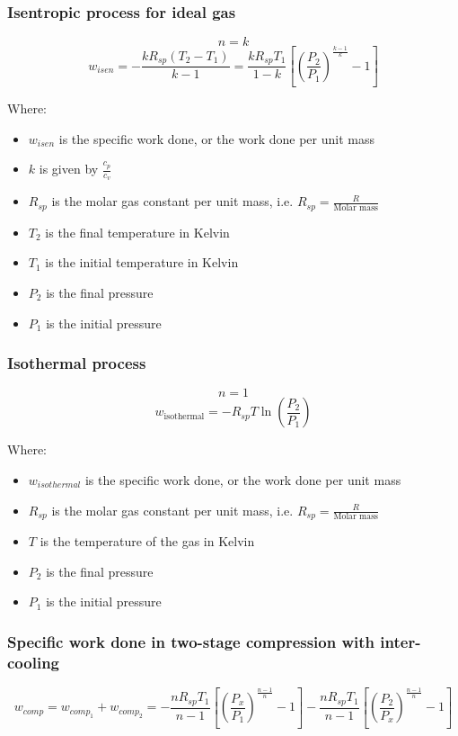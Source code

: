 \documentclass[11pt]{article}
\begin{document}
\subsubsection{Isentropic process for ideal gas}
\label{sec:org0c5a5aa}
\[n = k\]
\[w_{isen} = - \frac{k R_{sp} (T_2 - T_1)}{k - 1} = \frac{k R_{sp} T_1}{1 - k} \left[\left(\frac{P_2}{P_1} \right)^{\frac{k - 1}{k}} - 1 \right]\]

Where:
\begin{itemize}
\item \(w_{isen}\) is the specific work done, or the work done per unit mass
\item \(k\) is given by \(\frac{c_p}{c_v}\)
\item \(R_{sp}\) is the molar gas constant per unit mass, i.e. \(R_{sp} = \frac{R}{\text{Molar mass}}\)
\item \(T_2\) is the final temperature in Kelvin
\item \(T_1\) is the initial temperature in Kelvin
\item \(P_2\) is the final pressure
\item \(P_1\) is the initial pressure
\end{itemize}
\subsubsection{Isothermal process}
\label{sec:orgce18788}
\[n = 1\]
\[w_{\text{isothermal}} = - R_{sp} T \ln \left(\frac{P_2}{P_1} \right)\]

Where:
\begin{itemize}
\item \(w_{isothermal}\) is the specific work done, or the work done per unit mass
\item \(R_{sp}\) is the molar gas constant per unit mass, i.e. \(R_{sp} = \frac{R}{\text{Molar mass}}\)
\item \(T\) is the temperature of the gas in Kelvin
\item \(P_2\) is the final pressure
\item \(P_1\) is the initial pressure
\end{itemize}
\subsubsection{Specific work done in two-stage compression with inter-cooling}
\label{sec:org6be0b21}
\[w_{comp} = w_{comp_1} + w_{comp_2} = - \frac{n R_{sp} T_1}{n - 1} \left[\left(\frac{P_x}{P_1} \right)^{\frac{n - 1}{n}} - 1 \right] - \frac{n R_{sp} T_1}{n - 1} \left[\left(\frac{P_2}{P_x} \right)^{\frac{n - 1}{n}} - 1 \right]\]
\end{document}
